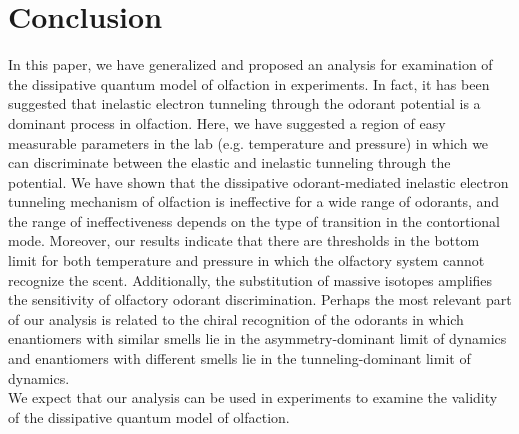 \documentclass[aps,prl,tightenlines,onecolumn,superscriptaddress]{revtex4}
\begin{document}
\section{Conclusion}
In this paper, we have generalized and proposed an analysis for examination of the dissipative quantum model of olfaction in experiments. In fact, it has been suggested that inelastic electron tunneling through the odorant potential is a dominant process in olfaction. Here, we have suggested a region of easy measurable parameters in the lab (e.g. temperature and pressure) in which we can discriminate between the elastic and inelastic tunneling through the potential. We have shown that the dissipative odorant-mediated inelastic electron tunneling mechanism of olfaction is ineffective for a wide range of odorants, and the range of ineffectiveness depends on the type of transition in the contortional mode. Moreover, our results indicate that there are thresholds in the bottom limit for both temperature and pressure in which the olfactory system cannot recognize the scent. Additionally, the substitution of massive isotopes amplifies the sensitivity of olfactory odorant discrimination. Perhaps the most relevant part of our analysis is related to the chiral recognition of the odorants in which enantiomers with similar smells lie in the asymmetry-dominant limit of dynamics and enantiomers with different smells lie in the tunneling-dominant limit of dynamics.\\
\indent We expect that our analysis can be used in experiments to examine the validity of the dissipative quantum model of olfaction.
\end{document}
